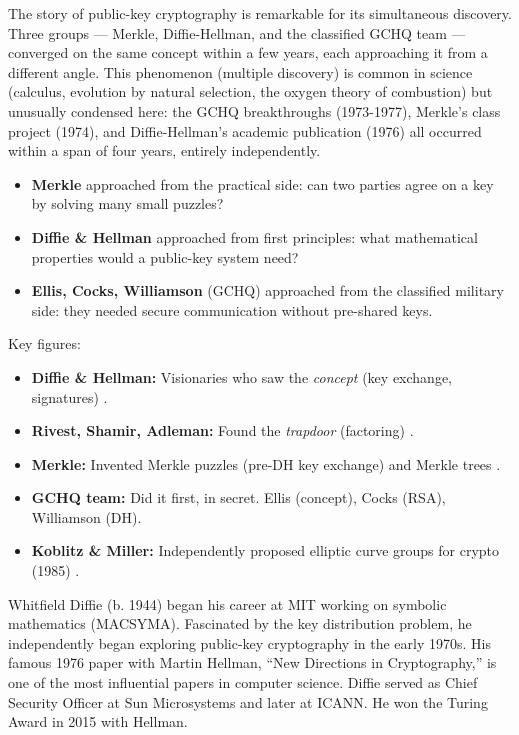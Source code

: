 The story of public-key cryptography is remarkable for its simultaneous discovery. Three groups — Merkle, Diffie-Hellman, and the classified GCHQ team — converged on the same concept within a few years, each approaching it from a different angle. This phenomenon (multiple discovery) is common in science (calculus, evolution by natural selection, the oxygen theory of combustion) but unusually condensed here: the GCHQ breakthroughs (1973-1977), Merkle's class project (1974), and Diffie-Hellman's academic publication (1976) all occurred within a span of four years, entirely independently.

\begin{itemize}
\item \textbf{Merkle} approached from the practical side: can two parties agree on a key by solving many small puzzles?
\item \textbf{Diffie \& Hellman} approached from first principles: what mathematical properties would a public-key system need?
\item \textbf{Ellis, Cocks, Williamson} (GCHQ) approached from the classified military side: they needed secure communication without pre-shared keys.
\end{itemize}

Key figures:

\begin{itemize}
\item \textbf{Diffie \& Hellman:} Visionaries who saw the \emph{concept} (key exchange, signatures) \cite{DiffieHellman1976}.
\item \textbf{Rivest, Shamir, Adleman:} Found the \emph{trapdoor} (factoring) \cite{RSA1978}.
\item \textbf{Merkle:} Invented Merkle puzzles (pre-DH key exchange) and Merkle trees \cite{Merkle1978}.
\item \textbf{GCHQ team:} Did it first, in secret. Ellis (concept), Cocks (RSA), Williamson (DH).
\item \textbf{Koblitz \& Miller:} Independently proposed elliptic curve groups for crypto (1985) \cite{Koblitz1987,Miller1985}.
\end{itemize}

Whitfield Diffie (b. 1944) began his career at MIT working on symbolic mathematics (MACSYMA). Fascinated by the key distribution problem, he independently began exploring public-key cryptography in the early 1970s. His famous 1976 paper with Martin Hellman, ``New Directions in Cryptography,'' is one of the most influential papers in computer science. Diffie served as Chief Security Officer at Sun Microsystems and later at ICANN. He won the Turing Award in 2015 with Hellman.

